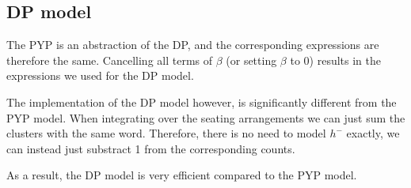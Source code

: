 \subsection{DP model}
The PYP is an abstraction of the DP, and the corresponding expressions are therefore the same. Cancelling all terms of $\beta$ (or setting $\beta$ to 0) results in the expressions we used for the DP model. 

The implementation of the DP model however, is significantly different from the PYP model. When integrating over the seating arrangements we can just sum the clusters with the same word. Therefore, there is no need to model $h^-$ exactly, we can instead just substract 1 from the corresponding counts.

As a result, the DP model is very efficient compared to the PYP model.
